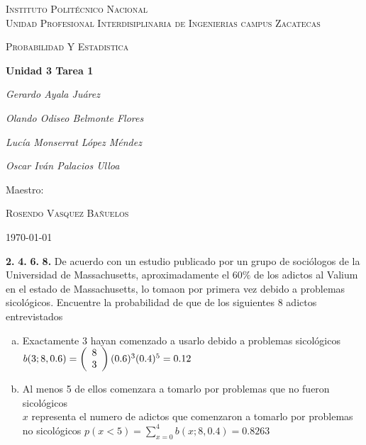 \documentclass[12pt, letterpaper]{article}
\begin{document}
    \begin{titlepage}
        \centering
        {\scshape\LARGE Instituto Politécnico Nacional\\ Unidad Profesional Interdisiplinaria de Ingenierias campus Zacatecas\par}
        \vspace{1cm}
        {\scshape\Large Probabilidad Y Estadistica\par}
        \vspace{1.5cm}
        {\huge\bfseries Unidad 3 Tarea 1\par}
        \vspace{2cm}
        {\Large\itshape Gerardo Ayala Juárez\par}
        {\Large\itshape Olando Odiseo Belmonte Flores\par}
        {\Large\itshape Lucía Monserrat López Méndez\par}
        {\Large\itshape Oscar Iván Palacios Ulloa\par}
        \vfill
        Maestro:\par
        \textsc{
        Rosendo Vasquez Bañuelos}
        \vfill
        {\large \today \par}
    \end{titlepage}

    \textbf{2. }\vskip1cm
    \textbf{4. }\vskip1cm
    \textbf{6. }\vskip1cm
    \textbf{8. }De acuerdo con un estudio publicado por un grupo de sociólogos de la Universidad de Massachusetts,
    aproximadamente el $60\%$ de los adictos al Valium en el estado de Massachusetts, lo tomaon por primera vez debido
    a problemas sicológicos. Encuentre la probabilidad de que de los siguientes 8 adictos entrevistados
    \begin{enumerate}[a)]
        \item Exactamente 3 hayan comenzado a usarlo debido a problemas sicológicos\\
            $b(3;8,0.6)=
            \left(\begin{array}{c l}
                      8\\3
            \end{array}\right)
            (0.6)^{3}(0.4)^{5}=0.12$
        \item Al menos 5 de ellos comenzara a tomarlo por problemas que no fueron sicológicos\\
            $x$ representa el numero de adictos que comenzaron a tomarlo por problemas no sicológicos
            $p(x<5)=\displaystyle\sum_{x=0}^{4}b(x;8,0.4)=0.8263$
    \end{enumerate}\vskip1cm
\end{document}
